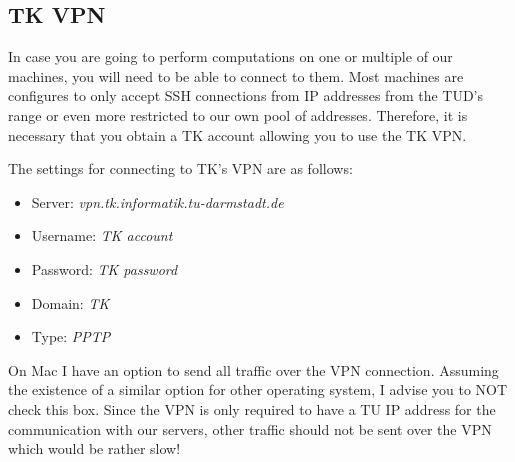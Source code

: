 \documentclass{article}
\newcommand{\img}[4]{
	\begin{figure}[!htb]
		\centering
		\texttt{[image: \#1]}
		\caption{#3}
		\label{#2}
	\end{figure}
}
\begin{document}
%
%
%
%




\subsection{TK VPN}

In case you are going to perform computations on one or multiple of our machines, you will need to be able to connect to them.
Most machines are configures to only accept SSH connections from IP addresses from the TUD's range or even more restricted to our own pool of addresses.
Therefore, it is necessary that you obtain a TK account allowing you to use the TK VPN.

The settings for connecting to TK's VPN are as follows:

\begin{itemize}
	\item Server: \emph{vpn.tk.informatik.tu-darmstadt.de}
	\item Username: \emph{TK account}
	\item Password: \emph{TK password}
	\item Domain: \emph{TK}
	\item Type: \emph{PPTP}
\end{itemize}

On Mac I have an option to send all traffic over the VPN connection.
Assuming the existence of a similar option for other operating system, I advise you to NOT check this box.
Since the VPN is only required to have a TU IP address for the communication with our servers, other traffic should not be sent over the VPN which would be rather slow!
\end{document}
